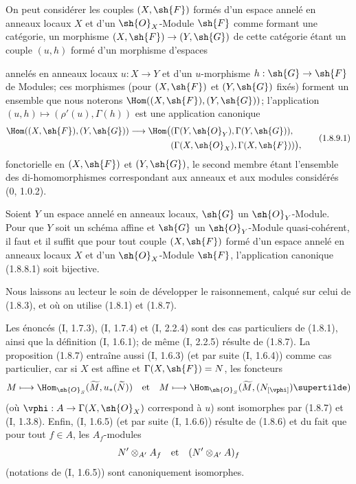 \begin{env}[1.8.9]
\label{ega2:addendum:I.1.8.9-fr}
On peut considérer les couples $(X,\sh{F})$ formés d'un espace annelé
en anneaux locaux $X$ et d'un $\sh{O}_X$-Module $\sh{F}$ comme formant
une catégorie, un morphisme $(X,\sh{F})\to(Y,\sh{G})$ de cette catégorie
étant un couple $(u,h)$ formé d'un morphisme d'espaces
annelés en anneaux locaux $u:X\to Y$ et d'un $u$-morphisme
$h:\sh{G}\to\sh{F}$ de Modules; ces
morphismes (pour $(X,\sh{F})$ et $(Y,\sh{G})$ fixés) forment un ensemble
que nous noterons $\Hom((X,\sh{F}),(Y,\sh{G}))$; l'application
$(u,h)\mapsto(\rho'(u),\Gamma(h))$ est une application canonique
\begin{equation}
\label{ega2:addendum:I.1.8.9.1-fr}
\begin{split}
  \Hom((X,\sh{F}),(Y,\sh{G}))\to
  \Hom\bigl(
    &(\Gamma(Y,\sh{O}_Y),\Gamma(Y,\sh{G})),\\
    &(\Gamma(X,\sh{O}_X),\Gamma(X,\sh{F}))
  \bigr),
\end{split}
\tag{1.8.9.1}
\end{equation}
fonctorielle en $(X,\sh{F})$ et $(Y,\sh{G})$, le second membre étant
l'ensemble des di-homomorphismes correspondant aux anneaux et aux
modules considérés (0, 1.0.2).
\end{env}

\begin{corollary}[1.8.10]
\label{ega2:addendum:I.1.8.10-fr}
Soient $Y$ un espace annelé en anneaux locaux, $\sh{G}$ un
$\sh{O}_Y$-Module. Pour que $Y$ soit un schéma affine et $\sh{G}$ un
$\sh{O}_Y$-Module quasi-cohérent, il faut et il suffit que pour tout
couple $(X,\sh{F})$ formé d'un espace annelé en anneaux locaux $X$ et
d'un $\sh{O}_X$-Module $\sh{F}$, l'application canonique (1.8.8.1) soit
bijective.
\end{corollary}

Nous laissons au lecteur le soin de développer le raisonnement, calqué
sur celui de (1.8.3), et où on utilise (1.8.1) et (1.8.7).

\begin{remark}[1.8.11]
\label{ega2:addendum:I.1.8.11-fr}
Les énoncés (I, 1.7.3), (I, 1.7.4) et (I, 2.2.4) sont des cas
particuliers de (1.8.1), ainsi que la définition (I, 1.6.1); de même
(I, 2.2.5) résulte de (1.8.7). La proposition (1.8.7) entraîne aussi
(I, 1.6.3) (et par suite (I, 1.6.4)) comme cas particulier, car si $X$
est affine et $\Gamma(X,\sh{F})=N$, les foncteurs
\[
  M\longmapsto
  \Hom_{\sh{O}_S}(\widetilde M,u_*(\widetilde N))
  \quad\hbox{et}\quad
  M\longmapsto
  \Hom_{\sh{O}_S}(\widetilde M,(N_{[\vphi]})\supertilde)
\]
(où $\vphi:A\to\Gamma(X,\sh{O}_X)$ correspond à $u$) sont isomorphes
par (1.8.7) et (I, 1.3.8). Enfin, (I, 1.6.5) (et par suite (I, 1.6.6))
résulte de (1.8.6) et du fait que pour tout $f\in A$, les $A_f$-modules
\[
  N'\otimes_{A'}A_f
  \quad\hbox{et}\quad
  (N'\otimes_{A'}A)_f
\]
(notations de (I, 1.6.5)) sont canoniquement isomorphes.
\end{remark}

